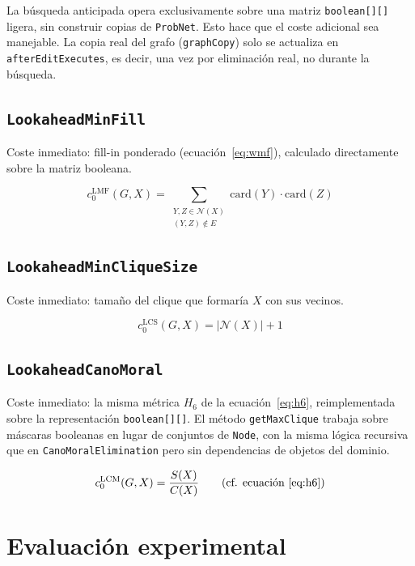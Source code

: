\documentclass[11pt, a4paper]{article}
\begin{document}
La búsqueda anticipada opera exclusivamente sobre una matriz \texttt{boolean[][]} ligera, sin construir copias de \texttt{ProbNet}. Esto hace que el coste adicional sea manejable. La copia real del grafo (\texttt{graphCopy}) solo se actualiza en \texttt{afterEditExecutes}, es decir, una vez por eliminación real, no durante la búsqueda.

\subsection{\texttt{LookaheadMinFill}}

Coste inmediato: fill-in ponderado (ecuación~\eqref{eq:wmf}), calculado directamente sobre la matriz booleana.

\begin{equation}
  c_0^{\mathrm{LMF}}(G, X) = \sum_{\substack{Y, Z \in \mathcal{N}(X) \\ (Y,Z) \notin E}} \mathrm{card}(Y) \cdot \mathrm{card}(Z)
\end{equation}

\subsection{\texttt{LookaheadMinCliqueSize}}

Coste inmediato: tamaño del clique que formaría $X$ con sus vecinos.

\begin{equation}
  c_0^{\mathrm{LCS}}(G, X) = |\mathcal{N}(X)| + 1
\end{equation}

\subsection{\texttt{LookaheadCanoMoral}}

Coste inmediato: la misma métrica $H_6$ de la ecuación~\eqref{eq:h6}, reimplementada sobre la representación \texttt{boolean[][]}. El método \texttt{getMaxClique} trabaja sobre máscaras booleanas en lugar de conjuntos de \texttt{Node}, con la misma lógica recursiva que en \texttt{CanoMoralElimination} pero sin dependencias de objetos del dominio.

\begin{equation}
  c_0^{\mathrm{LCM}}(G, X) = \frac{S(X)}{C(X)}
  \qquad \text{(cf. ecuación~\eqref{eq:h6})}
\end{equation}

\section{Evaluación experimental}
\label{sec:eval}
\end{document}
